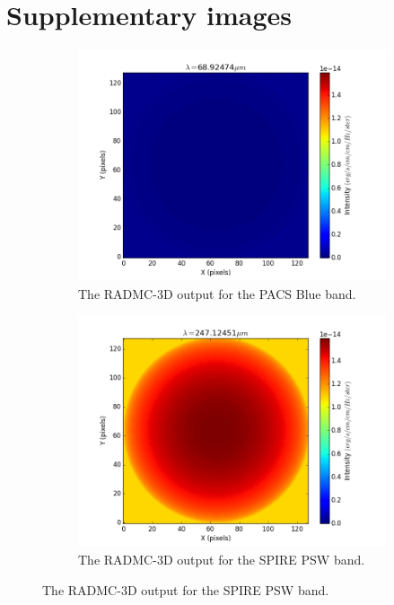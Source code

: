 \documentclass{report}
\begin{document}
\section*{Supplementary images}
\begin{figure}[H]
\centering

\begin{subfigure}[b]{.45\linewidth}
\includegraphics[width=\linewidth]{../img/output/blue.png}
\caption{The RADMC-3D output for the PACS Blue band.}\label{fig:isoblue}
\end{subfigure}
\begin{subfigure}[b]{.45\linewidth}
\includegraphics[width=\linewidth]{../img/output/psw.png}
\caption{The RADMC-3D output for the SPIRE PSW band.}\label{fig:isopsw}
\end{subfigure}


\end{figure}
\end{document}
